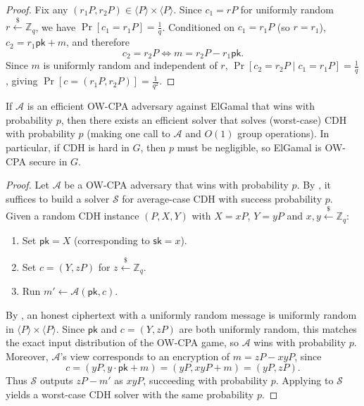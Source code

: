 \begin{proof}
    Fix any \((r_1P, r_2P) \in \langle P \rangle \times \langle P \rangle\).
    Since \(c_1 = rP\) for uniformly random \(r \xleftarrow{\$} \mathbb{Z}_q\), we have \(\Pr[c_1 = r_1P] = \frac{1}{q}\).
    Conditioned on \(c_1 = r_1P\) (so \(r = r_1\)), \(c_2 = r_1 \mathsf{pk} + m\), and therefore
    \[
        c_2 = r_2P \iff m = r_2P - r_1\mathsf{pk}.
    \]
    Since \(m\) is uniformly random and independent of \(r\), \(\Pr[c_2 = r_2P \mid c_1 = r_1P] = \frac{1}{q}\), giving \(\Pr[c = (r_1P, r_2P)] = \frac{1}{q^2}\).
\end{proof}

\begin{theorem}\label{thm:elgamal-ow-cpa}
    If \(\mathcal{A}\) is an efficient OW-CPA adversary against ElGamal that wins with probability \(p\), then there exists an efficient solver that solves (worst-case) CDH with probability \(p\) (making one call to \(\mathcal{A}\) and \(O(1)\) group operations).
    In particular, if CDH is hard in \(G\), then \(p\) must be negligible, so ElGamal is OW-CPA secure in \(G\).
\end{theorem}

\begin{proof}
    Let \(\mathcal{A}\) be a OW-CPA adversary that wins with probability \(p\). By , it suffices to build a solver \(\mathcal{S}\) for average-case CDH with success probability \(p\).
    Given a random CDH instance \((P, X, Y)\) with \(X = xP\), \(Y = yP\) and \(x, y \xleftarrow{\$} \mathbb{Z}_q\):
    \begin{enumerate}
        \item Set \(\mathsf{pk} = X\) (corresponding to \(\mathsf{sk} = x\)).
        \item Set \(c = (Y, zP)\) for \(z \xleftarrow{\$} \mathbb{Z}_q\).
        \item Run \(m' \gets \mathcal{A}(\mathsf{pk}, c)\).
    \end{enumerate}
    By , an honest ciphertext with a uniformly random message is uniformly random in \(\langle P \rangle \times \langle P \rangle\).
    Since \(\mathsf{pk}\) and \(c = (Y, zP)\) are both uniformly random, this matches the exact input distribution of the OW-CPA game, so \(\mathcal{A}\) wins with probability \(p\).
    Moreover, \(\mathcal{A}\)'s view corresponds to an encryption of \(m = zP - xyP\), since
    \[
        c = (yP, y \cdot \mathsf{pk} + m) = (yP, xyP + m) = (yP, zP).
    \]
    Thus \(\mathcal{S}\) outputs \(zP - m'\) as \(xyP\), succeeding with probability \(p\).
    Applying  to \(\mathcal{S}\) yields a worst-case CDH solver with the same probability \(p\).
\end{proof}

